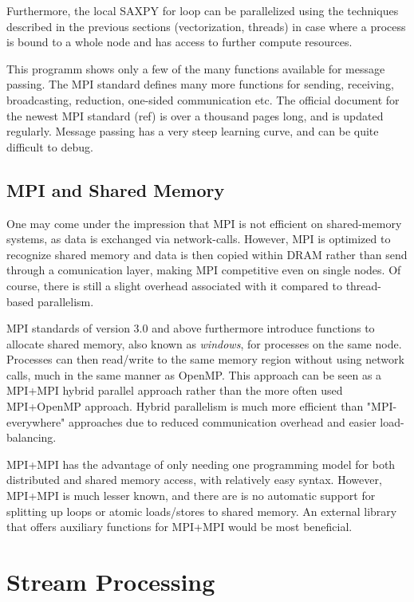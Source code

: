 Furthermore, the local SAXPY for loop can be parallelized using the techniques described in the previous sections (vectorization, threads) in case where a process is bound to a whole node and has access to further compute resources.

This programm shows only a few of the many functions available for message passing. The MPI standard defines many more functions for sending, receiving, broadcasting, reduction, one-sided communication etc. The official document for the newest MPI standard (ref) is over a thousand pages long, and is updated regularly. Message passing has a very steep learning curve, and can be quite difficult to debug.  


\subsection{MPI and Shared Memory}

One may come under the impression that MPI is not efficient on shared-memory systems, as data is exchanged via network-calls. However, MPI is optimized to recognize shared memory and data is then copied within DRAM rather than send through a comunication layer, making MPI competitive even on single nodes. Of course, there is still a slight overhead associated with it compared to thread-based parallelism.

MPI standards of version 3.0 and above furthermore introduce functions to allocate shared memory, also known as \emph{windows}, for processes on the same node. Processes can then read/write to the same memory region without using network calls, much in the same manner as OpenMP. This approach can be seen as a MPI+MPI hybrid parallel approach rather than the more often used MPI+OpenMP approach. Hybrid parallelism is much more efficient than "MPI-everywhere" approaches due to reduced communication overhead and easier load-balancing. 

MPI+MPI has the advantage of only needing one programming model for both distributed and shared memory access, with relatively easy syntax. However, MPI+MPI is much lesser known, and there are is no automatic support for splitting up loops or atomic loads/stores to shared memory. An external library that offers auxiliary functions for MPI+MPI would be most beneficial.

\section{Stream Processing}

